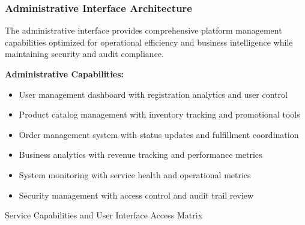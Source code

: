 \subsubsection{Administrative Interface Architecture}

The administrative interface provides comprehensive platform management capabilities optimized for operational efficiency and business intelligence while maintaining security and audit compliance.

\textbf{Administrative Capabilities:}
\begin{itemize}
\item User management dashboard with registration analytics and user control
\item Product catalog management with inventory tracking and promotional tools
\item Order management system with status updates and fulfillment coordination
\item Business analytics with revenue tracking and performance metrics
\item System monitoring with service health and operational metrics
\item Security management with access control and audit trail review
\end{itemize}

\begin{table}[H]
\centering
\caption{Service Capabilities and User Interface Access Matrix}
\label{tab:service-capabilities-matrix}
\end{table}